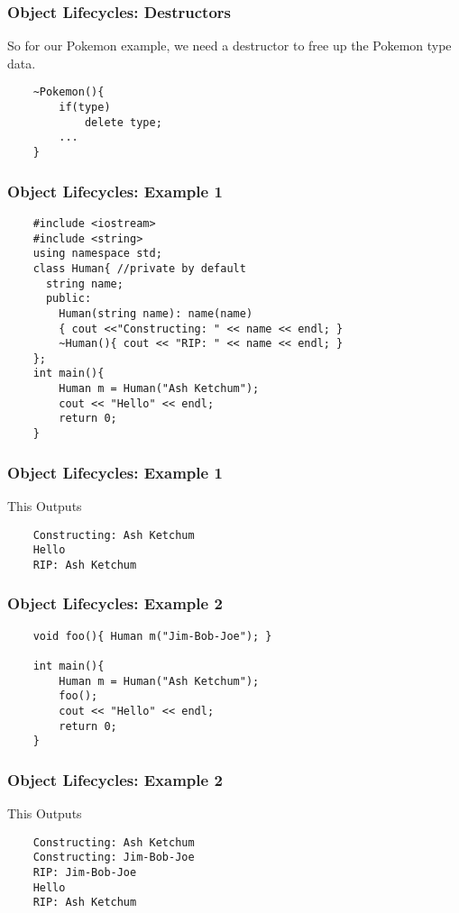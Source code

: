 \documentclass{beamer}
\begin{document}
\begin{frame}[fragile]
    \frametitle{Object Lifecycles: Destructors}
    So for our Pokemon example, we need a destructor to free up the Pokemon type data.

    \begin{verbatim}
    ~Pokemon(){ 
        if(type) 
            delete type;
        ...
    }
    \end{verbatim}
\end{frame}

\begin{frame}[fragile]
    \frametitle{Object Lifecycles: Example 1}
    \begin{verbatim}
    #include <iostream>
    #include <string>
    using namespace std;
    class Human{ //private by default
      string name;
      public:
        Human(string name): name(name) 
        { cout <<"Constructing: " << name << endl; }
        ~Human(){ cout << "RIP: " << name << endl; }
    };
    int main(){
        Human m = Human("Ash Ketchum");
        cout << "Hello" << endl;
        return 0;
    }
    \end{verbatim}
\end{frame}
\begin{frame}[fragile]
    \frametitle{Object Lifecycles: Example 1}
    This Outputs
    \begin{verbatim}
    Constructing: Ash Ketchum
    Hello
    RIP: Ash Ketchum
    \end{verbatim}

\end{frame}

\begin{frame}[fragile]
    \frametitle{Object Lifecycles: Example 2}
    \begin{verbatim}
    void foo(){ Human m("Jim-Bob-Joe"); }

    int main(){
        Human m = Human("Ash Ketchum");
        foo();
        cout << "Hello" << endl;
        return 0;
    }
    \end{verbatim}
\end{frame}
\begin{frame}[fragile]
    \frametitle{Object Lifecycles: Example 2}
    This Outputs
    \begin{verbatim}
    Constructing: Ash Ketchum
    Constructing: Jim-Bob-Joe
    RIP: Jim-Bob-Joe
    Hello
    RIP: Ash Ketchum
    \end{verbatim}

\end{frame}
\end{document}
